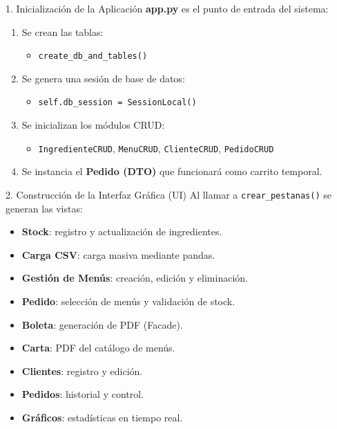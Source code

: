 \documentclass{beamer}
\begin{document}
\begin{frame}{1. Inicialización de la Aplicación}
\textbf{app.py} es el punto de entrada del sistema:

\begin{enumerate}
    \item Se crean las tablas:
    \begin{itemize}
        \item \texttt{create\_db\_and\_tables()}
    \end{itemize}

    \item Se genera una sesión de base de datos:
    \begin{itemize}
        \item \texttt{self.db\_session = SessionLocal()}
    \end{itemize}

    \item Se inicializan los módulos CRUD:
    \begin{itemize}
        \item \texttt{IngredienteCRUD}, \texttt{MenuCRUD}, \texttt{ClienteCRUD}, \texttt{PedidoCRUD}
    \end{itemize}

    \item Se instancia el \textbf{Pedido (DTO)} que funcionará como carrito temporal.
\end{enumerate}
\end{frame}

\begin{frame}{2. Construcción de la Interfaz Gráfica (UI)}
Al llamar a \texttt{crear\_pestanas()} se generan las vistas:

\begin{itemize}
    \item \textbf{Stock}: registro y actualización de ingredientes.
    \item \textbf{Carga CSV}: carga masiva mediante pandas.
    \item \textbf{Gestión de Menús}: creación, edición y eliminación.
    \item \textbf{Pedido}: selección de menús y validación de stock.
    \item \textbf{Boleta}: generación de PDF (Facade).
    \item \textbf{Carta}: PDF del catálogo de menús.
    \item \textbf{Clientes}: registro y edición.
    \item \textbf{Pedidos}: historial y control.
    \item \textbf{Gráficos}: estadísticas en tiempo real.
\end{itemize}
\end{frame}
\end{document}
